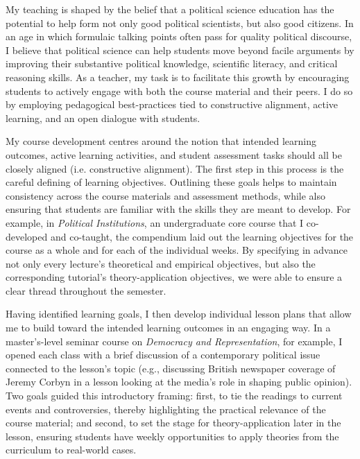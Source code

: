 \documentclass[letterpaper]{scrartcl}
\begin{document}
My teaching is shaped by the belief that a political science education has the potential to help form not only good political scientists, but also good citizens. In an age in which formulaic talking points often pass for quality political discourse, I believe that political science can help students move beyond facile arguments by improving their substantive political knowledge, scientific literacy, and critical reasoning skills. As a teacher, my task is to facilitate this growth by encouraging students to actively engage with both the course material and their peers. I do so by employing pedagogical best-practices tied to constructive alignment, active learning, and an open dialogue with students.

My course development centres around the notion that intended learning outcomes, active learning activities, and student assessment tasks should all be closely aligned (i.e. constructive alignment). The first step in this process is the careful defining of learning objectives. Outlining these goals helps to maintain consistency across the course materials and assessment methods, while also ensuring that students are familiar with the skills they are meant to develop. For example, in \textit{Political Institutions}, an undergraduate core course that I co-developed and co-taught, the compendium laid out the learning objectives for the course as a whole and for each of the individual weeks. By specifying in advance not only every lecture's theoretical and empirical objectives, but also the corresponding tutorial's theory-application objectives, we were able to ensure a clear thread throughout the semester. 

Having identified learning goals, I then develop individual lesson plans that allow me to build toward the intended learning outcomes in an engaging way. In a master's-level seminar course on \textit{Democracy and Representation}, for example, I opened each class with a brief discussion of a contemporary political issue connected to the lesson's topic (e.g., discussing British newspaper coverage of Jeremy Corbyn in a lesson looking at the media's role in shaping public opinion). Two goals guided this introductory framing: first, to tie the readings to current events and controversies, thereby highlighting the practical relevance of the course material; and second, to set the stage for theory-application later in the lesson, ensuring students have weekly opportunities to apply theories from the curriculum to real-world cases. 
\end{document}
